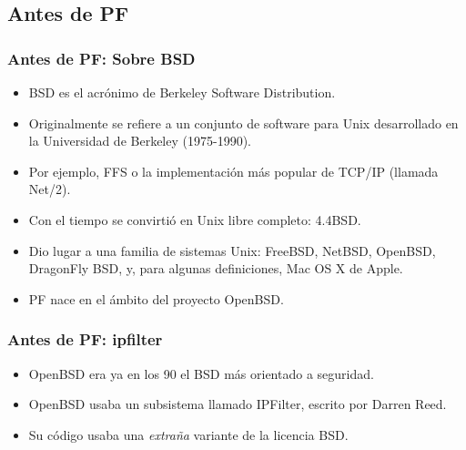 \documentclass{beamer}
\begin{document}
\subsection{Antes de PF}

\begin{frame}
\frametitle{Antes de PF: Sobre BSD}

\begin{itemize}
\item \alert{BSD} es el acrónimo de Berkeley Software Distribution.
\item Originalmente se refiere a un conjunto de software para Unix desarrollado en la Universidad de Berkeley (1975-1990).
\item Por ejemplo, FFS o la implementación más popular de TCP/IP (llamada Net/2). 
\item Con el tiempo se convirtió en Unix \alert{libre} completo: 4.4BSD. 
\item Dio lugar a una familia de sistemas Unix: FreeBSD, NetBSD, OpenBSD, DragonFly BSD, y, para algunas definiciones, Mac OS X de Apple.
\item \alert{PF} nace en el ámbito del proyecto OpenBSD.
\end{itemize}

\end{frame}


\begin{frame}
\frametitle{Antes de PF: ipfilter}

\begin{itemize}
\item OpenBSD era ya en los 90 el BSD más orientado a seguridad.
\item OpenBSD usaba un subsistema llamado \alert{IPFilter}, escrito por Darren Reed.
\item Su código usaba una \textit{extraña} variante de la licencia BSD.
\end{itemize}

\end{frame}

\end{document}
